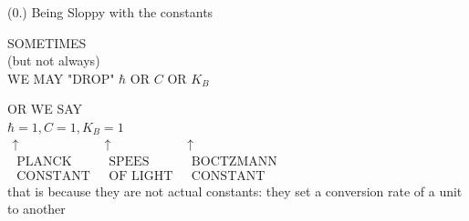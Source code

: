 \documentclass[10pt]{article}
\begin{document}
\captionsetup{singlelinecheck=false}
(0.) Being Sloppy with the constants

SOMETIMES\\
(but not always)\\
WE MAY "DROP" $\hbar$ OR $C$ OR $K_{B}$

OR WE SAY\\
$\hbar=1, C=1, K_{B}=1$\\
$\begin{array}{ccc}\uparrow & \uparrow & \uparrow \\ \text { PLANCK } & \text { SPEES } & \text { BOCTZMANN } \\ \text { CONSTANT } & \text { OF LIGHT } & \text { CONSTANT }\end{array}$\\
that is because they are not actual constants: they set a conversion rate of a unit to another
\end{document}
